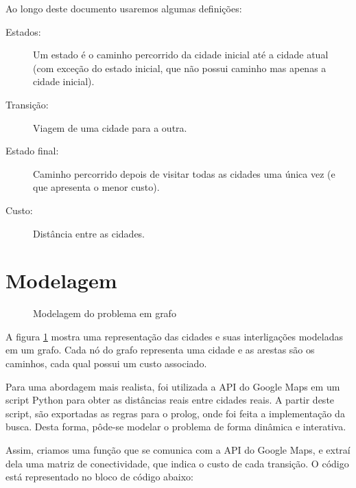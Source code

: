 \documentclass[12pt,a4paper]{article}
\begin{document}
Ao longo deste documento usaremos algumas definições:
\begin{description}
  \item 
    [Estados:] Um estado é o caminho percorrido da cidade inicial até a cidade atual (com exceção do estado inicial, que não possui caminho mas apenas a cidade inicial).

  \item[Transição:] Viagem de uma cidade para a outra.

  \item [Estado final:] Caminho percorrido depois de visitar todas as cidades uma única vez (e que apresenta o menor custo).

\item [Custo:] Distância entre as cidades.

\end{description}
	
\newpage

\section{Modelagem}

\begin{figure}[htpb]
  \centering
  
  \caption{Modelagem do problema em grafo}
  \label{fig:1}
\end{figure}

A figura \ref{fig:1} mostra uma representação das cidades e suas interligações modeladas em um grafo. Cada nó do grafo representa uma cidade e as arestas são os caminhos, cada qual possui um custo associado.

Para uma abordagem mais realista, foi utilizada a API do Google Maps em um script Python para obter as distâncias reais entre cidades reais. A partir deste script, são exportadas as regras para o prolog, onde foi feita a implementação da busca. Desta forma, pôde-se modelar o problema de forma dinâmica e interativa.

Assim, criamos uma função que se comunica com a API do Google Maps, e extraí dela uma matriz de conectividade, que indica o custo de cada transição. O código está representado no bloco de código abaixo:

\begin{mdframed}[linecolor=black, topline=true, bottomline=true,
  leftline=false, rightline=false, backgroundcolor=yellow!10!white]
\inputminted[tabsize=2,linenos=true,fontsize=\footnotesize,breaklines=true,breakafter=format]{python}{../DistanceMatrix.py}
\end{mdframed}
\end{document}
